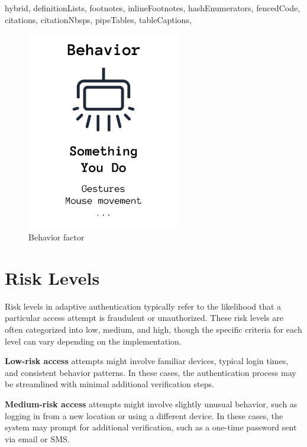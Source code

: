 \documentclass[
  digital,     %
  oneside,     %
  nosansbold,  %
  nocolorbold, %
  lof,         %
  lot,         %
]{fithesis4}
\begin{document}
\begin{markdown*}{%
  hybrid,
  definitionLists,
  footnotes,
  inlineFootnotes,
  hashEnumerators,
  fencedCode,
  citations,
  citationNbsps,
  pipeTables,
  tableCaptions,
}
\begin{figure}[htbp]
  \centering
  \includegraphics[width=0.6\textwidth]{img/behavior-final.png}
  \caption{Behavior factor}
  \label{fig:behavior-factor}
\end{figure}


\newpage
\section{Risk Levels}
Risk levels in adaptive authentication typically refer to the likelihood that a particular access attempt is fraudulent or unauthorized.
These risk levels are often categorized into low, medium, and high, though the specific criteria for each level can vary depending on the implementation.

\textbf{Low-risk access} attempts might involve familiar devices, typical login times, and consistent behavior patterns. In these cases, the authentication process may be streamlined with minimal additional verification steps.

\textbf{Medium-risk access} attempts might involve slightly unusual behavior, such as logging in from a new location or using a different device.
In these cases, the system may prompt for additional verification, such as a one-time password sent via email or SMS.


\end{markdown*}
\end{document}
